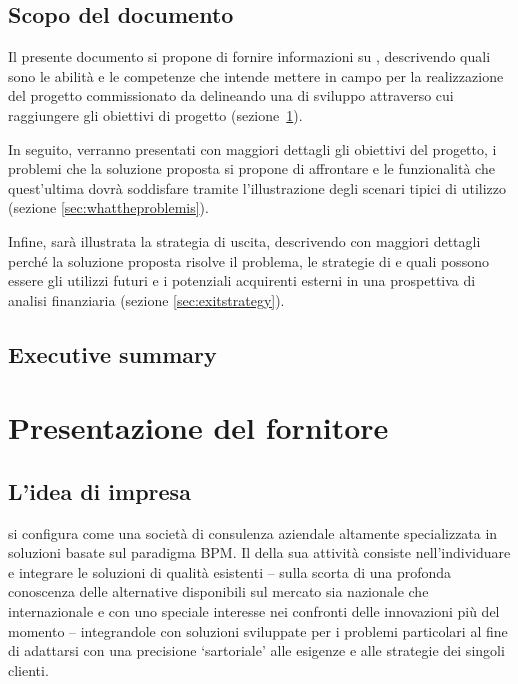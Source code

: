 \subsection{Scopo del documento}
Il presente documento si propone di fornire informazioni su \team, descrivendo quali sono le abilità e le competenze che intende mettere in campo per la realizzazione del progetto commissionato da \customer delineando una  di sviluppo attraverso cui raggiungere gli obiettivi di progetto (sezione~\ref{sec:whoweare}).

In seguito, verranno presentati con maggiori dettagli gli obiettivi del progetto, i problemi che la soluzione proposta si propone di affrontare e le funzionalità che quest'ultima dovrà soddisfare tramite l'illustrazione degli scenari tipici di utilizzo (sezione \ref{sec:whattheproblemis}).
 
Infine, sarà illustrata la strategia di uscita, descrivendo con maggiori dettagli perché la soluzione proposta risolve il problema, le strategie di \mktg e quali possono essere gli utilizzi futuri e i potenziali acquirenti esterni in una prospettiva di analisi finanziaria (sezione \ref{sec:exitstrategy}).

\subsection{Executive summary}



\clearpage

\section{Presentazione del fornitore}\label{sec:whoweare}

\subsection{L'idea di impresa}
\team si configura come una società di consulenza aziendale altamente specializzata in soluzioni basate sul paradigma BPM\@. Il  della sua attività consiste nell'individuare e integrare le soluzioni di qualità esistenti -- sulla scorta di una profonda conoscenza delle alternative disponibili sul mercato sia nazionale che internazionale e con uno speciale interesse nei confronti delle innovazioni più  del momento -- integrandole con  soluzioni sviluppate  per i problemi particolari al fine di adattarsi con una precisione `sartoriale' alle esigenze e alle strategie dei singoli clienti.

